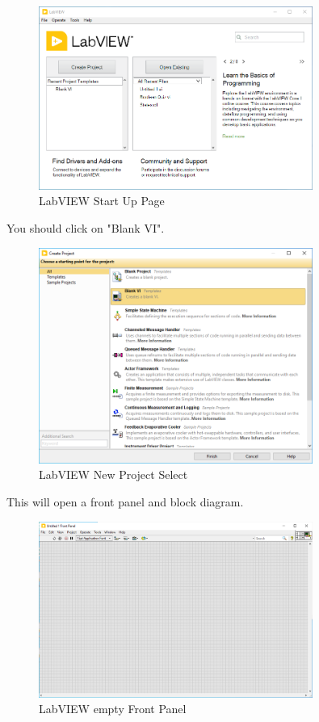 \documentclass[a4paper,11pt]{report}
\begin{document}
\begin{figure}[H]
\centering
\includegraphics[width=0.8\textwidth]{screenshots/labview1}
\caption{LabVIEW Start Up Page}
\end{figure}

You should click on "Blank VI".

\begin{figure}[H]
\centering
\includegraphics[width=0.8\textwidth]{screenshots/labview2}
\caption{LabVIEW New Project Select}
\end{figure}

This will open a front panel and block diagram.

\begin{figure}[H]
\centering
\includegraphics[width=0.8\textwidth]{screenshots/labview3}
\caption{LabVIEW empty Front Panel}
\end{figure}
\end{document}
